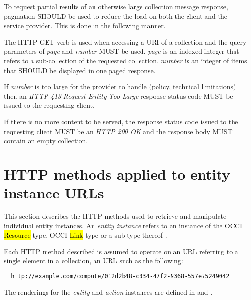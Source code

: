 \documentclass[10pt,a4paper]{article}
\begin{document}
To request partial results of an otherwise large collection message response, pagination SHOULD be used to reduce the load on
both the client and the service provider. This is done in the following manner.

The HTTP GET verb is used when accessing a URI of a collection and the query parameters of {\em page} and {\em number} MUST be used. {\em page} is an indexed
integer that refers to a sub-collection of the requested collection. {\em number} is an integer of items that SHOULD be displayed in one paged response.


If {\em number} is too large for the provider to handle (policy, technical limitations) then an \emph{HTTP 413 Request Entity Too Large} response status code MUST be issued to the requesting client.

If there is no more content to be served, the response status code issued to the requesting client MUST be an \emph{HTTP 200 OK} and the response body MUST contain an empty collection.

\section{HTTP methods applied to entity instance URLs}





This section describes the HTTP methods used to retrieve and manipulate
individual entity instances. An {\em entity instance} refers to an instance
of the OCCI \hl{Resource} type, OCCI \hl{Link} type or a sub-type thereof
\cite{occi:core}.

Each HTTP method described is assumed to operate
on an URL referring to a single element in a collection, an URL such as the
following:
\begin{verbatim}
  http://example.com/compute/012d2b48-c334-47f2-9368-557e75249042
\end{verbatim}

The renderings for the {\em entity} and {\em action} instances are defined in \cite{occi:text} and \cite{occi:json}.
\end{document}
